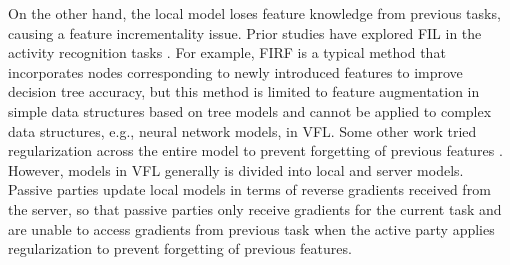 




On the other hand, the local model loses feature knowledge from previous tasks, causing a feature incrementality issue. 
Prior studies have explored FIL in the activity recognition tasks \cite{8410016,ni2024feature}. 
For example, FIRF \cite{8410016} is a typical method that incorporates nodes corresponding to newly introduced features to improve decision tree accuracy, but this method is limited to feature augmentation in simple data structures based on tree models and cannot be applied to complex data structures, e.g., neural network models, in VFL.
Some other work tried regularization across the entire model to prevent forgetting of previous features \cite{ni2024feature,10227560}. 
However, models in VFL generally is divided into local and server models.
Passive parties update local models in terms of reverse gradients received from the server, so that passive parties only receive gradients for the current task and are unable to access gradients from previous task when the active party applies regularization to prevent forgetting of previous features.


